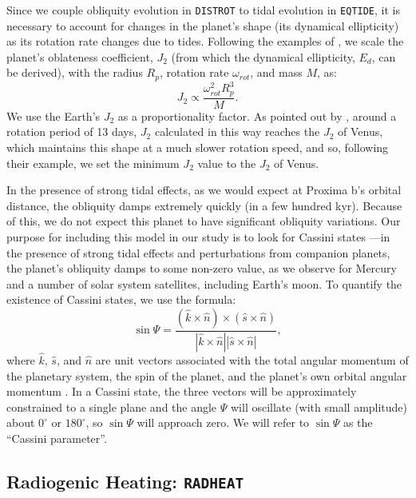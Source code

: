 \documentclass[preprint,12pt]{aastex}
\def\distrot{\texttt{\footnotesize{DISTROT}}\xspace}
\def\eqtide{\texttt{\footnotesize{EQTIDE}}\xspace}
\def\radheat{\texttt{\footnotesize{RADHEAT}}\xspace}
\begin{document}
Since we couple obliquity evolution in \distrot to tidal evolution in \eqtide, it is 
necessary to account for changes in the planet's shape (its dynamical ellipticity)
as its rotation rate changes due to tides. Following the examples of 
\cite{Atobe2007, Brasser2014}, we scale the planet's oblateness coefficient, $J_2$ 
(from which the dynamical ellipticity, $E_d$, can be derived), with the radius $R_p$, 
rotation rate $\omega_{rot}$, and mass $M$, as:
\begin{equation}
J_2 \propto \frac{\omega_{rot}^2 R_p^3}{M}.
\end{equation}
We use the Earth's $J_2$ as a proportionality factor. As pointed out by 
\cite{Brasser2014}, around a rotation period of 13 days, $J_2$ calculated in this 
way reaches the $J_2$ of Venus, which maintains this shape at a much slower 
rotation speed, and so, following their example, we set the 
minimum $J_2$ value to the  $J_2$ of Venus.
 
In the presence of strong tidal effects, as we would expect at Proxima b's orbital 
distance, the obliquity damps extremely quickly (in a few hundred kyr). Because 
of this, we do not expect this planet to have significant obliquity variations. Our 
purpose for including this model in our study is to look for Cassini states 
\citep{Colombo1966}---in the presence of strong tidal effects and perturbations
from companion planets, the planet's obliquity damps to some non-zero value, 
as we observe for Mercury and a number of solar system satellites, including 
Earth's moon. To quantify the existence of Cassini states, we use the formula:
\begin{equation}
\sin{\Psi} = \frac{(\hat{k}\times \hat{n}) \times (\hat{s} \times \hat{n})}{ | \hat{k}
\times \hat{n}  | \left | \hat{s} \times \hat{n} \right |},
\label{eqn:cassini}
\end{equation}
where $\hat{k}$, $\hat{s}$, and $\hat{n}$ are unit vectors associated with 
the total angular momentum of the planetary system, the spin of the planet,
and the planet's own orbital angular momentum \citep[see][]{Hamilton2004}.
In a Cassini state, the three vectors will be approximately constrained to a
single plane and the angle $\Psi$ will oscillate (with small amplitude) 
about $0^{\circ}$ or $180^{\circ}$, so $\sin{\Psi}$ will approach zero. 
We will refer to $\sin{\Psi}$ as the ``Cassini parameter''.

\subsection{Radiogenic Heating: \radheat}
\label{sec:models:radheat}
\end{document}
